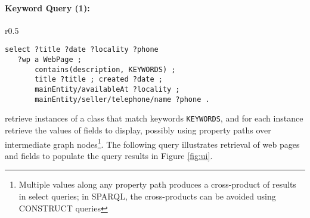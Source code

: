 \paragraph{Keyword Query (1):} 
\begin{wrapfigure}{r}{0.5\textwidth}
{\footnotesize
\begin{verbatim}
select ?title ?date ?locality ?phone
   ?wp a WebPage ; 
       contains(description, KEYWORDS) ;   
       title ?title ; created ?date ;
       mainEntity/availableAt ?locality ;
       mainEntity/seller/telephone/name ?phone .
\end{verbatim}}
\end{wrapfigure}
retrieve instances of a class that match keywords \verb|KEYWORDS|, and for each instance retrieve the values of fields to display, possibly using property paths over intermediate graph nodes\footnote{Multiple values along any property path produces a cross-product of results in select queries; in SPARQL, the cross-products can be avoided using  CONSTRUCT queries}.
The following query illustrates retrieval of web pages and fields to populate the query results in Figure \ref{fig:ui}.
%

